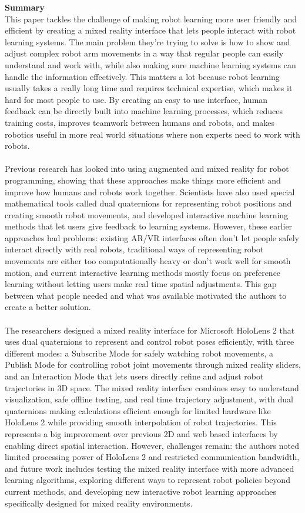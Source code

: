 \documentclass[report.tex]{subfiles}
\begin{document}
\noindent\textbf{Summary} \\
This paper tackles the challenge of making robot learning more user friendly and efficient by creating a mixed reality interface that lets people interact with robot learning systems. The main problem they're trying to solve is how to show and adjust complex robot arm movements in a way that regular people can easily understand and work with, while also making sure machine learning systems can handle the information effectively. This matters a lot because robot learning usually takes a really long time and requires technical expertise, which makes it hard for most people to use. By creating an easy to use interface, human feedback can be directly built into machine learning processes, which reduces training costs, improves teamwork between humans and robots, and makes robotics useful in more real world situations where non experts need to work with robots.\\\\
Previous research has looked into using augmented and mixed reality for robot programming, showing that these approaches make things more efficient and improve how humans and robots work together. Scientists have also used special mathematical tools called dual quaternions for representing robot positions and creating smooth robot movements, and developed interactive machine learning methods that let users give feedback to learning systems. However, these earlier approaches had problems: existing AR/VR interfaces often don't let people safely interact directly with real robots, traditional ways of representing robot movements are either too computationally heavy or don't work well for smooth motion, and current interactive learning methods mostly focus on preference learning without letting users make real time spatial adjustments. This gap between what people needed and what was available motivated the authors to create a better solution.
\noindent\textbf{}\\\\The researchers designed a mixed reality interface for Microsoft HoloLens 2 that uses dual quaternions to represent and control robot poses efficiently, with three different modes: a Subscribe Mode for safely watching robot movements, a Publish Mode for controlling robot joint movements through mixed reality sliders, and an Interaction Mode that lets users directly refine and adjust robot trajectories in 3D space. The mixed reality interface combines easy to understand visualization, safe offline testing, and real time trajectory adjustment, with dual quaternions making calculations efficient enough for limited hardware like HoloLens 2 while providing smooth interpolation of robot trajectories. This represents a big improvement over previous 2D and web based interfaces by enabling direct spatial interaction. However, challenges remain: the authors noted limited processing power of HoloLens 2 and restricted communication bandwidth, and future work includes testing the mixed reality interface with more advanced learning algorithms, exploring different ways to represent robot policies beyond current methods, and developing new interactive robot learning approaches specifically designed for mixed reality environments.\\
\end{document}
